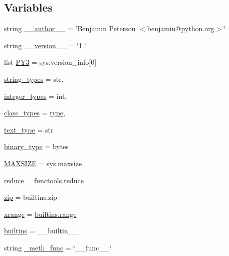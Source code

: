 \subsection*{Variables}
\begin{DoxyCompactItemize}
\item 
string \hyperlink{namespacescipy_1_1lib_1_1six_a328922c6b2c7c7a6f7f870102763581a}{\+\_\+\+\_\+author\+\_\+\+\_\+} = \char`\"{}Benjamin Peterson $<$benjamin@python.\+org$>$\char`\"{}
\item 
string \hyperlink{namespacescipy_1_1lib_1_1six_a8a7a1135007b807085cb9117666c4b5f}{\+\_\+\+\_\+version\+\_\+\+\_\+} = \char`\"{}1..\char`\"{}
\item 
list \hyperlink{namespacescipy_1_1lib_1_1six_a219ebb61dd5513feca6a793af7108565}{P\+Y3} = sys.\+version\+\_\+info\mbox{[}0\mbox{]}
\item 
\hyperlink{namespacescipy_1_1lib_1_1six_ab7d44b5e5efb2c9424a99771370a2b75}{string\+\_\+types} = str,
\item 
\hyperlink{namespacescipy_1_1lib_1_1six_ab3d712263074d969314c1557a5278962}{integer\+\_\+types} = int,
\item 
\hyperlink{namespacescipy_1_1lib_1_1six_a4e5d688a3a8b59076843000fb6840efb}{class\+\_\+types} = \hyperlink{fftw__dct_8c_a7aead736a07eaf25623ad7bfa1f0ee2d}{type},
\item 
\hyperlink{namespacescipy_1_1lib_1_1six_a7b798523483b958248140e5358279764}{text\+\_\+type} = str
\item 
\hyperlink{namespacescipy_1_1lib_1_1six_ad0ec4d14e4e0262380ef4520bf1b8c0a}{binary\+\_\+type} = bytes
\item 
\hyperlink{namespacescipy_1_1lib_1_1six_a0e44d1c92a1c1235e042733d43ffa569}{M\+A\+X\+S\+I\+Z\+E} = sys.\+maxsize
\item 
\hyperlink{namespacescipy_1_1lib_1_1six_a55a8dcb1092257e1cef3702b1b27fe88}{reduce} = functools.\+reduce
\item 
\hyperlink{namespacescipy_1_1lib_1_1six_a8ce7c8fa2e5ffc126c86f133fc4e980e}{zip} = builtins.\+zip
\item 
\hyperlink{namespacescipy_1_1lib_1_1six_a2de9a36079b0c876003b969f93e6cbfa}{xrange} = \hyperlink{numinquire_8h_a35e47346e37a09731e9c2d704288937d}{builtins.\+range}
\item 
\hyperlink{namespacescipy_1_1lib_1_1six_a48f14cc1ca56812333cd2c83526340f8}{builtins} = \+\_\+\+\_\+builtin\+\_\+\+\_\+
\item 
string \hyperlink{namespacescipy_1_1lib_1_1six_a1b44ea9070c7951d1da4e12927b3d7e5}{\+\_\+meth\+\_\+func} = \char`\"{}\+\_\+\+\_\+func\+\_\+\+\_\+\char`\"{}

\end{DoxyCompactItemize}
